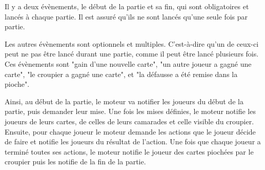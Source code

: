 Il y a deux évènements, le début de la partie et sa fin, qui sont obligatoires et lancés à chaque partie. Il est assuré qu'ils ne sont lancés qu'une seule fois par partie.

Les autres évènements sont optionnels et multiples. C'est-à-dire qu'un de ceux-ci peut ne pas être lancé durant une partie, comme il peut être lancé plusieurs fois. Ces évènements sont "gain d'une nouvelle carte", "un autre joueur a gagné une carte", "le croupier a gagné une carte", et "la défausse a été remise dans la pioche".

Ainsi, au début de la partie, le moteur va notifier les joueurs du début de la partie, puis demander leur mise. Une fois les mises définies, le moteur notifie les joueurs de leurs cartes, de celles de leurs camarades et celle visible du croupier. Ensuite, pour chaque joueur le moteur demande les actions que le joueur décide de faire et notifie les joueurs du résultat de l'action. Une fois que chaque joueur a terminé toutes ses actions, le moteur notifie le joueur des cartes piochées par le croupier puis les notifie de la fin de la partie.

